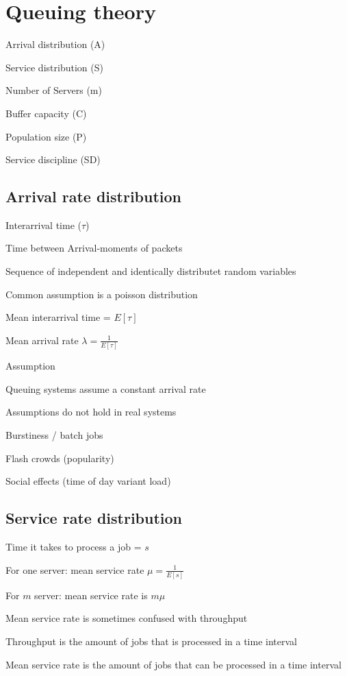 \section{Queuing theory}
\enumstart
	\item Arrival distribution (A)
	\item Service distribution (S)
	\item Number of Servers (m)
	\item Buffer capacity (C)
	\item Population size (P)
	\item Service discipline (SD)
\enumend

\subsection{Arrival rate distribution}
\enumstart
	\item Interarrival time ($\tau$)
	\enumstart
		\item Time between Arrival-moments of packets
		\item Sequence of independent and identically distributet random variables
		\item Common assumption is a poisson distribution
	\enumend
	\item Mean interarrival time = $E[\tau]$
	\item Mean arrival rate $\lambda = \frac{1}{E[\tau]}$
	\item Assumption
	\enumstart
		\item Queuing systems assume a constant arrival rate
		\item Assumptions do not hold in real systems
		\enumstart
			\item Burstiness / batch jobs
			\item Flash crowds (popularity)
			\item Social effects (time of day variant load)
		\enumend
	\enumend
\enumend

\subsection{Service rate distribution}
\enumstart
	\item Time it takes to process a job = $s$
	\item For one server: mean service rate $\mu = \frac{1}{E[s]}$
	\item For $m$ server: mean service rate is $m\mu$
	\item Mean service rate is sometimes confused with throughput
	\item Throughput is the amount of jobs that is processed in a time interval
	\item Mean service rate is the amount of jobs that can be processed in a time interval
\enumend

